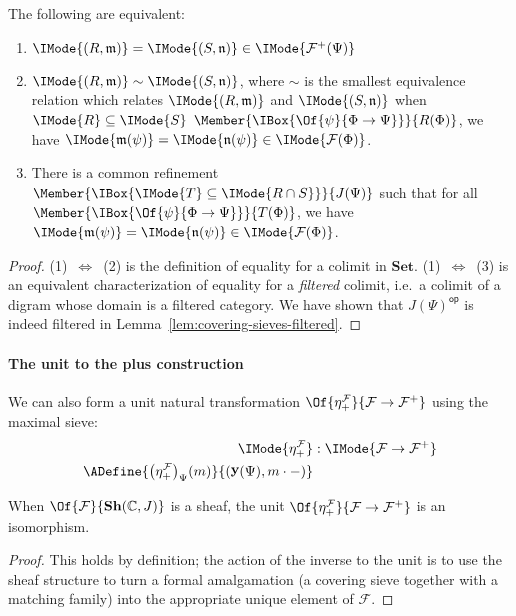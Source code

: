 \documentclass{article}
\newcommand\Sets{\mathbf{Set}}
\newcommand\OpCat[1]{{{#1}^{\mathsf{op}}}}
\DeclareMathOperator\OpYoneda{\mathbf{y}}
\newcommand\Yoneda[1]{\OpYoneda({#1})}
\newcommand\Sh[1]{\mathbf{Sh} (#1)}
\newcommand\IsSubsetEq[2]{\IMode{#1}\subseteq\IMode{#2}}
\newcommand\AOf[2]{\IMode{#1}&:\IMode{#2}}
\newcommand\Plus[1]{{#1}^+}
\newcommand\IsEqIn[3]{\IMode{#1}=\IMode{#2}\in\IMode{#3}}
\newcommand\Sim[2]{\IMode{#1}\sim\IMode{#2}}
\begin{document}
\begin{lem}[Equality in $\Plus{\mathcal{F}}$]\label{lem:plus-construction-equality}
  The following are equivalent:
  \begin{enumerate}
  \item $\IsEqIn{(R,\mathfrak{m})}{(S,\mathfrak{n})}{\Plus{\mathcal{F}}(\Psi)}$
  \item $\Sim{(R,\mathfrak{m})}{(S,\mathfrak{n})}$, where
    $\sim$ is the smallest equivalence relation which relates
    $\IMode{(R,\mathfrak{m})}$ and $\IMode{(S,\mathfrak{n})}$ when $\IsSubsetEq{R}{S}$
    $\Member{\IBox{\Of{\psi}{\Phi\to\Psi}}}{R(\Phi)}$, we have
    $\IsEqIn{\mathfrak{m}(\psi)}{\mathfrak{n}(\psi)}{\mathcal{F}(\Phi)}$.
  \item There is a common refinement
    $\Member{\IBox{\IsSubsetEq{T}{R\cap S}}}{J(\Psi)}$ such that for
    all $\Member{\IBox{\Of{\psi}{\Phi\to\Psi}}}{T(\Phi)}$, we have
    $\IsEqIn{\mathfrak{m}(\psi)}{\mathfrak{n}(\psi)}{\mathcal{F}(\Phi)}$.
  \end{enumerate}
\end{lem}
\begin{proof}
  (1)~$\Leftrightarrow$~(2) is the definition of equality for a colimit in
  $\Sets$.
  (1)~$\Leftrightarrow$~(3) is an equivalent characterization of
  equality for a \emph{filtered} colimit, i.e.\ a colimit of a digram
  whose domain is a filtered category. We have shown that
  $\OpCat{J(\Psi)}$ is indeed filtered in
  Lemma~\ref{lem:covering-sieves-filtered}.
\end{proof}

\paragraph{The unit to the plus construction}
We can also form a unit natural transformation
$\Of{\eta_+^{\mathcal{F}}}{\mathcal{F}\to\Plus{\mathcal{F}}}$ using
the maximal sieve:
\begin{align*}
  \AOf{\eta_+^{\mathcal{F}}}{\mathcal{F}\to\Plus{\mathcal{F}}}
  \\
  \ADefine{
    {\left(\eta_+^{\mathcal{F}}\right)}_\Psi(m)
  }{
    (\Yoneda{\Psi},m\cdot-)
  }
\end{align*}

\begin{lem}\label{lem:executing-formal-amalgamations}
  When $\Of{\mathcal{F}}{\Sh{\mathbb{C},J}}$ is a sheaf, the unit
  $\Of{\eta_+^{\mathcal{F}}}{\mathcal{F}\to\Plus{\mathcal{F}}}$ is an
  isomorphism.
\end{lem}
\begin{proof}
  This holds by definition; the action of the inverse to the unit is
  to use the sheaf structure to turn a formal amalgamation (a covering
  sieve together with a matching family) into the appropriate unique
  element of $\mathcal{F}$.
\end{proof}
\end{document}
